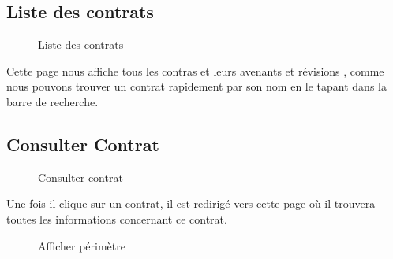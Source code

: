\documentclass[a4paper]{report}
\begin{document}
\subsection{Liste des contrats}
\begin{figure}[H]
	\begin{center}
		\caption{Liste des contrats}
	\end{center}
\end{figure}
Cette page nous affiche tous les contras et leurs avenants et révisions , comme nous pouvons trouver un contrat rapidement par son nom en le tapant dans la barre de recherche.
\subsection{Consulter Contrat}
\begin{figure}[H]
	\begin{center}
		\caption{Consulter contrat}
	\end{center}
\end{figure}
Une fois il clique sur un contrat, il est redirigé vers cette page où il trouvera toutes les informations concernant ce contrat.
\begin{figure}[H]
	\begin{center}
		\caption{Afficher périmètre}
	\end{center}
\end{figure}
\end{document}

